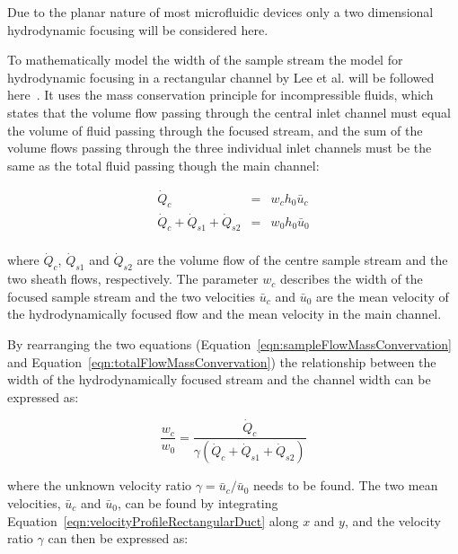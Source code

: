 
Due to the planar nature of most microfluidic devices only a two dimensional hydrodynamic focusing will be considered here.

To mathematically model the width of the sample stream the model for hydrodynamic focusing in a rectangular channel by Lee et al. will be followed here~\cite{Lee2006}. It uses the mass conservation principle for incompressible fluids, which states that the volume flow passing through the central inlet channel must equal the volume of fluid passing through the focused stream, and the sum of the volume flows passing through the three individual inlet channels must be the same as the total fluid passing though the main channel:

\begin{eqnarray}
	\dot{Q}_{c} &=& w_{c}h_{0}\bar{u}_{c} \label{eqn:sampleFlowMassConvervation} \\
	\dot{Q}_{c} + \dot{Q}_{s1}+ \dot{Q}_{s2} &=& w_{0}h_{0}\bar{u}_{0} \label{eqn:totalFlowMassConvervation} \\
\end{eqnarray} 

where  $\dot{Q}_{c}$,  $\dot{Q}_{s1}$ and  $\dot{Q}_{s2}$ are the volume flow of the centre sample stream and the two sheath flows, respectively. The parameter $w_{c}$ describes the width of the focused sample stream and the two velocities $\bar{u}_{c}$ and $\bar{u}_{0}$ are the mean velocity of the hydrodynamically focused flow and the mean velocity in the main channel. 

By rearranging the two equations (Equation~\ref{eqn:sampleFlowMassConvervation} and Equation~\ref{eqn:totalFlowMassConvervation}) the relationship between the width of the hydrodynamically focused stream and the channel width can be expressed as:

\begin{equation}
	\frac{w_{c}}{w_{0}} = \frac{\dot{Q}_{c}}{\gamma(\dot{Q}_{c}+\dot{Q}_{s1}+\dot{Q}_{s2})}
	\label{eqn:hydrodynamicFocusingWidthRatio}
\end{equation}

where the unknown velocity ratio $\gamma=\bar{u}_{c}/\bar{u}_{0}$ needs to be found. The two mean velocities, $\bar{u}_{c}$ and $\bar{u}_{0}$, can be found by integrating Equation~\ref{eqn:velocityProfileRectangularDuct} along $x$ and $y$, and the velocity ratio $\gamma$ can then be expressed as:

